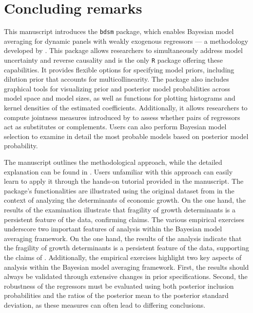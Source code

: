 \documentclass[a4paper]{article}
\begin{document}
\section{Concluding remarks}\label{sum}
This manuscript introduces the \verb+bdsm+ package, which enables Bayesian model averaging for dynamic panels with weakly exogenous regressors — a methodology developed by \citet{Moral+2012,Moral+2013,Moral+2016}. This package allows researchers to simultaneously address model uncertainty and reverse causality and is the only \verb+R+ package offering these capabilities. It provides flexible options for specifying model priors, including dilution prior that accounts for multicollinearity. The package also includes graphical tools for visualizing prior and posterior model probabilities across model space and model sizes, as well as functions for plotting histograms and kernel densities of the estimated coefficients. Additionally, it allows researchers to compute jointness measures introduced by \citet{Doppelhofer+2009,Ley+2007,Hofmarcher+2018} to assess whether pairs of regressors act as substitutes or complements. Users can also perform Bayesian model selection to examine in detail the most probable models based on posterior model probability.

The manuscript outlines the methodological approach, while the detailed explanation can be found in \citet{Moral+2012,Moral+2013,Moral+2016}. Users unfamiliar with this approach can easily learn to apply it through the hands-on tutorial provided in the manuscript. The package’s functionalities are illustrated using the original dataset from \citet{Moral+2016} in the context of analyzing the determinants of economic growth. On the one hand, the results of the examination illustrate that fragility of growth determinants is a persistent feature of the data, confirming \citet{Moral+2016} claims. The various empirical exercises underscore two important features of analysis within the Bayesian model averaging framework. On the one hand, the results of the analysis indicate that the fragility of growth determinants is a persistent feature of the data, supporting the claims of \citet{Moral+2016}. Additionally, the empirical exercises highlight two key aspects of analysis within the Bayesian model averaging framework. First, the results should always be validated through extensive changes in prior specifications. Second, the robustness of the regressors must be evaluated using both posterior inclusion probabilities and the ratios of the posterior mean to the posterior standard deviation, as these measures can often lead to differing conclusions.




\end{document}
